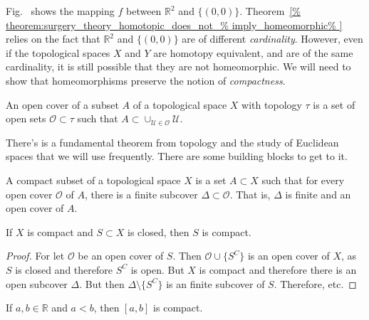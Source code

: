\documentclass[crop=false,class=article,oneside]{standalone}
\begin{document}
        Fig.~
        shows the mapping $f$ between $\mathbb{R}^{2}$ and
        $\{(0,0)\}$.
        Theorem~\ref{%
            theorem:surgery_theory_homotopic_does_not_%
            imply_homeomorphic%
        }
        relies on the fact that $\mathbb{R}^{2}$ and $\{(0,0)\}$
        are of different \textit{cardinality}. However, even
        if the topological spaces $X$ and $Y$ are homotopy
        equivalent, and are of the same cardinality, it is
        still possible that they are not homeomorphic.
        We will need to show that homeomorphisms preserve
        the notion of \textit{compactness}.
        \begin{definition}
            An open cover of a subset $A$ of a topological
            space $X$ with topology $\tau$
            is a set of open sets
            $\mathcal{O}\subset\tau$ such that
            $A\subset\cup_{\mathcal{U}\in\mathcal{O}}\mathcal{U}$.
        \end{definition}
        There's is a fundamental theorem from topology and
        the study of Euclidean spaces that we will use frequently.
        There are some building blocks to get to it.
        \begin{definition}
            A compact subset of a topological space $X$ is a
            set $A\subset{X}$ such that for every open cover
            $\mathcal{O}$ of $A$, there is a finite subcover
            $\Delta\subset\mathcal{O}$. That is,
            $\Delta$ is finite and an open cover of $A$.
        \end{definition}
        \begin{theorem}
            If $X$ is compact and
            $S\subset{X}$ is closed, then
            $S$ is compact.
        \end{theorem}
        \begin{proof}
            For let $\mathcal{O}$ be an open cover
            of $S$. Then
            $\mathcal{O}\cup\{S^{C}\}$ is an open
            cover of $X$, as $S$ is closed and therefore
            $S^{C}$ is open. But $X$ is compact and therefore
            there is an open subcover $\Delta$. But then
            $\Delta\setminus\{S^{C}\}$ is an finite subcover
            of $S$. Therefore, etc.
        \end{proof}
        \begin{theorem}
            If $a,b\in\mathbb{R}$ and $a<b$, then
            $[a,b]$ is compact.
        \end{theorem}
\end{document}
